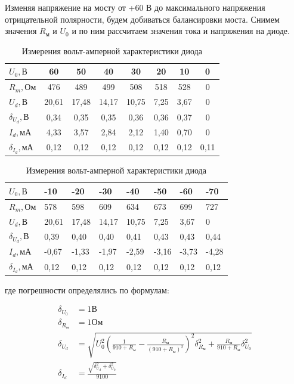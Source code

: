 \documentclass[a4paper,12pt]{article}
\begin{document}
Изменяя напряжение на мосту от +60 В до максимального напряжения отрицательной полярности, будем добиваться балансировки моста. Снимем значения $R_м$ и $U_0$ и по ним рассчитаем значения тока и напряжения на диоде.

\begin{table}[h]
\centering
\caption{Измерения вольт-амперной характеристики диода}
\begin{tabular}{|l|c|c|c|c|c|c|c|}
\hline
$U_0, В$ & 60 & 50 & 40 & 30 & 20 & 10 & 0 \\ \hline
$R_m, Ом$ & 476 & 489 & 499 & 508 & 518 & 528 & 0 \\ \hline
$U_d, В$ & 20,61 & 17,48 & 14,17 & 10,75 & 7,25 & 3,67 & 0 \\ \hline
$\delta_{U_d}, В$ & 0,34 & 0,35 & 0,35 & 0,36 & 0,36 & 0,37 & 0 \\ \hline
$I_d, мА$ & 4,33 & 3,57 & 2,84 & 2,12 & 1,40 & 0,70 & 0 \\ \hline
$\delta_{I_d}, мА$ &	0,12 & 0,12 & 0,12 & 0,12 & 0,12 & 0,12 & 0,11 \\ \hline
\end{tabular}
\end{table}

\begin{table}[h]
\centering
\caption{Измерения вольт-амперной характеристики диода}
\begin{tabular}{|l|l|l|l|l|l|l|l|}
\hline
$U_0, В$ & -10 & -20 & -30 & -40 & -50 & -60 & -70 \\ \hline
$R_m, Ом$ & 578 & 598 & 609 & 634 & 673 & 699 & 727 \\ \hline
$U_d, В$ & 20,61 & 17,48 & 14,17 & 10,75 & 7,25 & 3,67 & 0 \\ \hline
$\delta_{U_d}, В$ & 0,39 & 0,40 & 0,40 & 0,41 & 0,43 & 0,43 & 0,44 \\ \hline
$I_d, мА$ & -0,67 & -1,33 & -1,97 & -2,59 & -3,16 & -3,73 & -4,28 \\ \hline
$\delta_{I_d}, мА$ &	0,12 & 0,12 & 0,12 & 0,12 & 0,12 & 0,12 & 0,12 \\ \hline
\end{tabular}
\end{table}

\newpage

где погрешности определялись по формулам:

\begin{align*}
	\delta_{U_0} &= 1 В \\
	\delta_{R_м} &= 1 Ом\\
	\delta_{U_d} &= \sqrt{U_0^2 \left( \frac{1}{910 + R_м} - \frac{R_м}{(910 + R_м)^2} \right)^2 \delta^2_{R_м} + \frac{R_м}{910 + R_м} \delta^2_{U_0}} \\
	\delta_{I_d} &= \frac{\sqrt{\delta^2_{U_d} + \delta^2_{U_0}}}{9100}
\end{align*}
\end{document}
